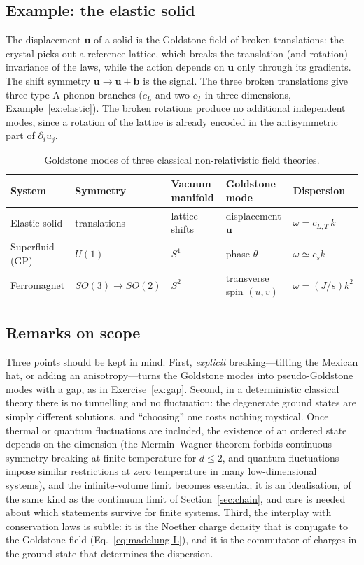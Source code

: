 \subsection{Example: the elastic solid}

The displacement $\mathbf{u}$ of a solid is the Goldstone field of broken translations:
the crystal picks out a reference lattice, which breaks the translation
(and rotation) invariance of the laws, while the action
depends on $\mathbf{u}$ only through its gradients. The shift symmetry
$\mathbf{u}\to\mathbf{u}+\mathbf{b}$ is the signal. The three broken translations give three
type-A phonon branches ($c_L$ and two $c_T$ in three dimensions, Example~\ref{ex:elastic}). The broken
rotations produce no additional independent modes, since a rotation of the
lattice is already encoded in the antisymmetric part of $\partial_iu_j$.

\begin{table}[t]
\centering
\small
\begin{tabular}{@{}lllll@{}}
\toprule
System & Symmetry & Vacuum manifold & Goldstone mode & Dispersion\\
\midrule
Elastic solid & translations & lattice shifts & displacement $\mathbf{u}$ & $\omega=c_{L,T}\,k$\\
Superfluid (GP) & $U(1)$ & $S^1$ & phase $\theta$ & $\omega\simeq c_sk$\\
Ferromagnet & $SO(3)\to SO(2)$ & $S^2$ & transverse spin $(u,v)$ & $\omega=(J/s)k^2$\\
\bottomrule
\end{tabular}
\caption{Goldstone modes of three classical non-relativistic field theories.}
\label{tab:goldstone}
\end{table}

\subsection{Remarks on scope}

Three points should be kept in mind. First, \emph{explicit} breaking---tilting the
Mexican hat, or adding an anisotropy---turns the Goldstone modes into
pseudo-Goldstone modes with a gap, as in Exercise~\ref{ex:gap}. Second, in a
deterministic classical theory there is no tunnelling and no fluctuation: the
degenerate ground states are simply different solutions, and ``choosing'' one
costs nothing mystical. Once thermal or quantum fluctuations are included, the
existence of an ordered state depends on the dimension (the Mermin--Wagner
theorem forbids continuous symmetry breaking at finite temperature for $d\le2$,
and quantum fluctuations impose similar restrictions at zero temperature in many low-dimensional
systems), and the infinite-volume
limit becomes essential; it is an idealisation, of the same kind as the
continuum limit of Section~\ref{sec:chain}, and care is needed about which statements
survive for finite systems. Third, the interplay with
conservation laws is subtle: it is the Noether charge density that is conjugate
to the Goldstone field (Eq.~\eqref{eq:madelung-L}), and it is the commutator of
charges in the ground state that determines the dispersion.


